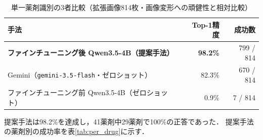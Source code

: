 \documentclass[dvipdfmx]{jsarticle}
\begin{document}
\begin{table}[htbp]
\centering
\caption{単一薬剤識別の3者比較（拡張画像814枚・画像変形への頑健性と相対比較）}
\label{tab:single_compare}
\begin{tabular}{lrr}
\hline
手法 & Top-1精度 & 成功数 \\
\hline
\textbf{ファインチューニング後 Qwen3.5-4B（提案手法）} & \textbf{98.2\%} & 799 / 814 \\
Gemini（\texttt{gemini-3.5-flash}・ゼロショット） & 82.3\% & 670 / 814 \\
ファインチューニング前 Qwen3.5-4B（ゼロショット） & 0.9\% & 7 / 814 \\
\hline
\end{tabular}
\end{table}

提案手法は98.2\%を達成し，41薬剤中29薬剤で100\%の正答であった．
提案手法の薬剤別の成功率を表\ref{tab:per_drug}に示す．
\end{document}
